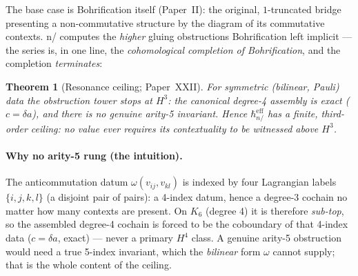 \documentclass[11pt,a4paper]{article}
\newcommand{\hbarn}{\hbar_{n/}}
\theoremstyle{plain}
\newtheorem{theorem}{Theorem}[section]
\theoremstyle{definition}
\theoremstyle{remark}
\begin{document}
The base case is Bohrification itself (Paper~II): the original, $1$-truncated
bridge presenting a non-commutative structure by the diagram of its commutative
contexts. n/ computes the \emph{higher} gluing obstructions Bohrification left
implicit --- the series is, in one line, the \emph{cohomological completion of
Bohrification}, and the completion \emph{terminates}:

\begin{theorem}[Resonance ceiling; Paper~XXII]
For symmetric (bilinear, Pauli) data the obstruction tower stops at $H^3$: the
canonical degree-4 assembly is exact ($c=\delta a$), and there is no genuine
arity-5 invariant. Hence $\hbarn^{\mathrm{eff}}$ has a finite, third-order
ceiling: no value ever requires its contextuality to be witnessed above $H^3$.
\end{theorem}

\paragraph{Why no arity-5 rung (the intuition).} The anticommutation datum
$\omega(v_{ij},v_{kl})$ is indexed by four Lagrangian labels $\{i,j,k,l\}$ (a
disjoint pair of pairs): a 4-index datum, hence a degree-3 cochain no matter how
many contexts are present. On $K_6$ (degree 4) it is therefore \emph{sub-top}, so
the assembled degree-4 cochain is forced to be the coboundary of that 4-index data
($c=\delta a$, exact) --- never a primary $H^4$ class. A genuine arity-5
obstruction would need a true 5-index invariant, which the \emph{bilinear} form
$\omega$ cannot supply; that is the whole content of the ceiling.
\end{document}
